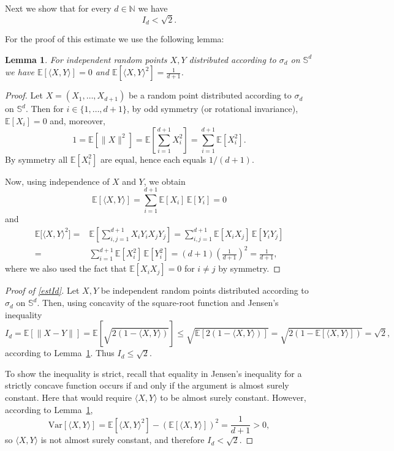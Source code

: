 \documentclass[12pt]{article}
\newtheorem{lemma}{Lemma}
\begin{document}
\begin{appendix}
\iffalse
Next we show that for every $d\in \mathbb{N}$ we have 
\begin{equation}\label{estId}
I_d < \sqrt{2}.
\end{equation}

For the proof of this estimate we use the following lemma:

\begin{lemma}\label{lem:coords}
For independent random points $X,Y$ distributed according to $\sigma_d$ on $\mathbb{S}^d$ we have $\mathbb{E}[\langle X,Y\rangle] = 0$ and $\mathbb{E}[\langle X,Y \rangle ^2] =\tfrac{1}{d+1}$.
\end{lemma}

\begin{proof}
Let $X=(X_1,\ldots,X_{d+1})$ be a random point distributed according to $\sigma_d$ on $\mathbb{S}^d$. Then for $i\in\{1,\dots,d+1\}$, by odd symmetry (or rotational invariance), $\mathbb{E}[X_i]=0$ and, moreover,
\[
1 = \mathbb{E}[\|X\|^2] = \mathbb{E}\left[\sum_{i=1}^{d+1} X_i^2\right]
= \sum_{i=1}^{d+1} \mathbb{E}[X_i^2].
\]
By symmetry all $\mathbb{E}[X_i^2]$ are equal, hence each equals $1/(d+1)$.

Now, using independence of $X$ and $Y$, we obtain 
\[
\mathbb{E}[\langle X , Y\rangle] = \sum_{i=1}^{d+1} \mathbb{E}[X_i]\,\mathbb{E}[Y_i] = 0
\]
and 
\begin{align*}
\mathbb{E}\bigl[\langle X,Y\rangle^2\bigr]
= & \mathbb{E}\left[\sum_{i,j=1}^{d+1} X_i Y_i X_j Y_j\right]
= \sum_{i,j=1}^{d+1} \mathbb{E}[X_i X_j]\, \mathbb{E}[Y_i Y_j]\\
= & \sum_{i=1}^{d+1} \mathbb{E}[X_i^2]\, \mathbb{E}[Y_i^2]
= (d+1)\left(\frac{1}{d+1}\right)^2
= \frac{1}{d+1},
\end{align*}
where we also used the fact that $\mathbb{E}[X_i X_j]=0$ for $i\neq j$ by symmetry.
\end{proof}

\begin{proof}[Proof of \eqref{estId}]
Let $X,Y$ be independent random points distributed according to $\sigma_d$ on $\mathbb{S}^d$. Then, using concavity of the square-root function and Jensen's inequality
\[
I_d = \mathbb{E}[\|X-Y\|]= \mathbb{E}[\sqrt{2(1-\langle X,Y\rangle)}] \le \sqrt{\mathbb{E}[2(1-\langle X,Y\rangle)]} = \sqrt{2(1-\mathbb{E}[\langle X,Y\rangle])}= \sqrt{2},
\]
according to Lemma~\ref{lem:coords}. Thus $I_d \le \sqrt{2}$.

To show the inequality is strict, recall that equality in Jensen's inequality for a strictly concave function occurs if and only if the argument is almost surely constant. Here that would require $\langle X,Y\rangle$ to be almost surely constant. However, according to Lemma~\ref{lem:coords}, 
\begin{equation*}%
\mathrm{Var}[\langle X,Y\rangle] = \mathbb{E}[\langle X,Y\rangle^2] - (\mathbb{E}[\langle X,Y\rangle])^2 = \frac{1}{d+1} > 0,
\end{equation*}
so $\langle X,Y\rangle$ is not almost surely constant, and therefore $I_d < \sqrt{2}$.
\end{proof}


\end{appendix}
\end{document}
